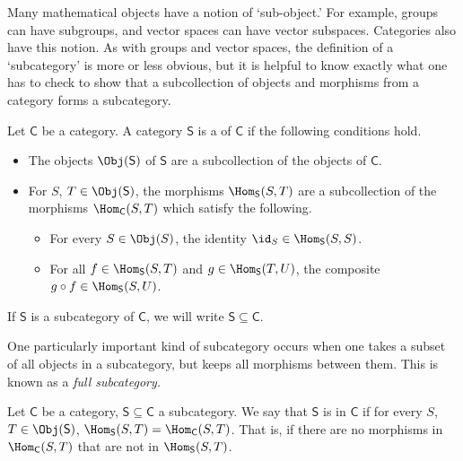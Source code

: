 \documentclass[main.tex]{subfiles}
\begin{document}
Many mathematical objects have a notion of `sub-object.' For example, groups can have subgroups, and vector spaces can have vector subspaces. Categories also have this notion. As with groups and vector spaces, the definition of a `subcategory' is more or less obvious, but it is helpful to know exactly what one has to check to show that a subcollection of objects and morphisms from a category forms a subcategory.

\begin{definition}[subcategory]
  \label{def:subcategory}
  Let $\mathsf{C}$ be a category. A category $\mathsf{S}$ is a  of $\mathsf{C}$ if the following conditions hold.
  \begin{itemize}
    \item The objects $\Obj(\mathsf{S})$ of $\mathsf{S}$ are a subcollection of the objects of $\mathsf{C}$.

    \item For $S$, $T \in \Obj(\mathsf{S})$, the morphisms $\Hom_{\mathsf{S}}(S, T)$ are a subcollection of the morphisms $\Hom_{\mathsf{C}}(S, T)$ which satisfy the following.
      \begin{itemize}
        \item For every $S \in \Obj(S)$, the identity $\id_{S} \in \Hom_{\mathsf{S}}(S, S)$.

        \item For all $f \in \Hom_{\mathsf{S}}(S, T)$ and $g \in \Hom_{\mathsf{S}}(T, U)$, the composite $g \circ f \in \Hom_{\mathsf{S}}(S, U)$.
      \end{itemize}
  \end{itemize}

  If $\mathsf{S}$ is a subcategory of $\mathsf{C}$, we will write $\mathsf{S} \subseteq \mathsf{C}$.
\end{definition}

One particularly important kind of subcategory occurs when one takes a subset of all objects in a subcategory, but keeps all morphisms between them. This is known as a \emph{full subcategory.}

\begin{definition}
  \label{def:fullsubcategory}
  Let $\mathsf{C}$ be a category, $\mathsf{S} \subseteq \mathsf{C}$ a subcategory. We say that $\mathsf{S}$ is  in $\mathsf{C}$ if for every $S$, $T \in \Obj(\mathsf{S})$, $\Hom_{\mathsf{S}}(S, T) = \Hom_{\mathsf{C}}(S, T)$. That is, if there are no morphisms in $\Hom_{\mathsf{C}}(S, T)$ that are not in $\Hom_{\mathsf{S}}(S, T)$.
\end{definition}
\end{document}
